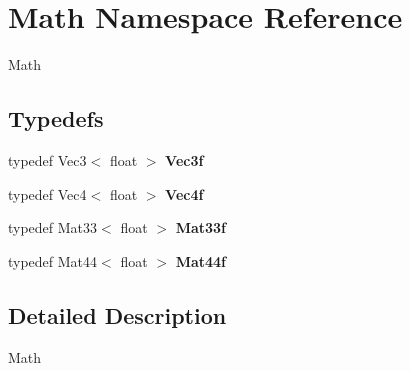 \hypertarget{namespaceMath}{
\section{Math Namespace Reference}
\label{namespaceMath}
}


Math  
\subsection*{Typedefs}
\begin{DoxyCompactItemize}
\item 
\hypertarget{namespaceMath_a540a602a5e3acc411b1b43f17e3a048a}{
typedef Vec3$<$ float $>$ {\bfseries Vec3f}}
\label{namespaceMath_a540a602a5e3acc411b1b43f17e3a048a}

\item 
\hypertarget{namespaceMath_a0e98b555da2a61096327295985ad9baa}{
typedef Vec4$<$ float $>$ {\bfseries Vec4f}}
\label{namespaceMath_a0e98b555da2a61096327295985ad9baa}

\item 
\hypertarget{namespaceMath_a770626dd812fd6f1c158bf58e4ff9496}{
typedef Mat33$<$ float $>$ {\bfseries Mat33f}}
\label{namespaceMath_a770626dd812fd6f1c158bf58e4ff9496}

\item 
\hypertarget{namespaceMath_a77ba68dc777c8d07ba71ded92405c363}{
typedef Mat44$<$ float $>$ {\bfseries Mat44f}}
\label{namespaceMath_a77ba68dc777c8d07ba71ded92405c363}

\end{DoxyCompactItemize}


\subsection{Detailed Description}
Math 